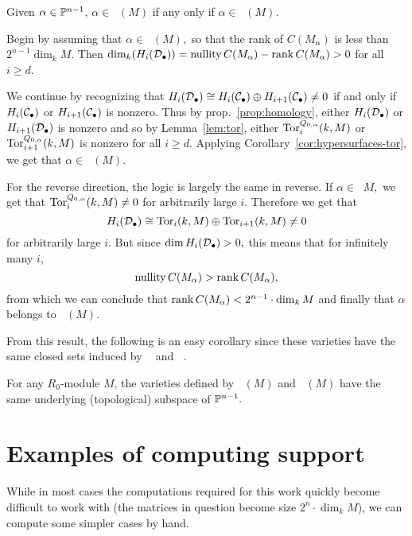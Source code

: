 \documentclass [11pt, proquest] {uwthesis}[2020/02/24]
\DeclareMathOperator{\supphRnaught}{supp^\mathit{hyp}_{R_0}}
\DeclareMathOperator{\supprRnaught}{supp^\mathit{rnk}_{R_0}}
\begin{document}
    \begin{thm}\label{thm:hyp-rank-equiv}
        Given $\alpha\in\mathbb{P}^{n-1}$, $\alpha\in\supprRnaught(M)$ if any only if $\alpha\in \supphRnaught(M).$
    \end{thm}
    \begin{prf}
        Begin by assuming that $\alpha\in\supprRnaught(M),$ so that the rank of $C(M_\alpha)$ is less than $2^{n-1}\dim_kM.$ Then $\dim_k(H_i(\mathcal{D}_\bullet))=\operatorname{nullity}C(M_\alpha)-\operatorname{rank} C(M_\alpha)>0$ for all $i\ge d$.
        
        We continue by recognizing that $H_i(\mathcal{D}_\bullet)\cong H_i(\mathcal{C}_\bullet)\oplus H_{i+1}(\mathcal{C}_\bullet)\ne0$ if and only if $H_i(\mathcal{C}_\bullet)$ or $H_{i+1}(\mathcal{C}_\bullet)$ is nonzero. Thus by prop.~\ref{prop:homology}, either $H_i(\mathcal{D}_\bullet)$ or $H_{i+1}(\mathcal{D}_\bullet)$ is nonzero and so by Lemma~\ref{lem:tor}, either $\operatorname{Tor}^{Q_{0,\alpha}}_i(k,M)$ or $\operatorname{Tor}^{Q_{0,\alpha}}_{i+1}(k,M)$ is nonzero for all $i\ge d$. Applying Corollary~\ref{cor:hypersurfaces-tor}, we get that $\alpha\in\supphRnaught(M).$
        
        For the reverse direction, the logic is largely the same in reverse. If $\alpha\in\supphRnaught M,$ we get that $\operatorname{Tor}_i^{Q_{0,\alpha}}(k,M)\ne0$ for arbitrarily large $i$. Therefore we get that 
        \[H_i(\mathcal{D}_\bullet)\cong \operatorname{Tor}_i(k,M)\oplus \operatorname{Tor}_{i+1}(k,M)\ne 0\]
        for arbitrarily large $i$. But since $\dim H_i(\mathcal{D}_\bullet)>0,$ this means that for infinitely many $i$,
        \[\operatorname{nullity} C(M_\alpha)>\operatorname{rank} C(M_\alpha),\]
        from which we can conclude that $\operatorname{rank} C(M_\alpha)<2^{n-1}\cdot\dim_k M$ and finally that $\alpha$ belongs to $\supprRnaught(M).$
    \end{prf}
    
    From this result, the following is an easy corollary since these varieties have the same closed sets induced by $\supphRnaught$ and $\supprRnaught$.
    \begin{cor}
        For any $R_0$-module $M$, the varieties defined by $\supphRnaught(M)$ and $\supprRnaught(M)$ have the same underlying (topological) subspace of $\mathbb{P}^{n-1}.$
    \end{cor}

\section{Examples of computing support}\label{sec:computing-support}
    While in most cases the computations required for this work quickly become difficult to work with (the matrices in question become size $2^n\cdot \dim_k M$), we can compute some simpler cases by hand. 
    
\end{document}
